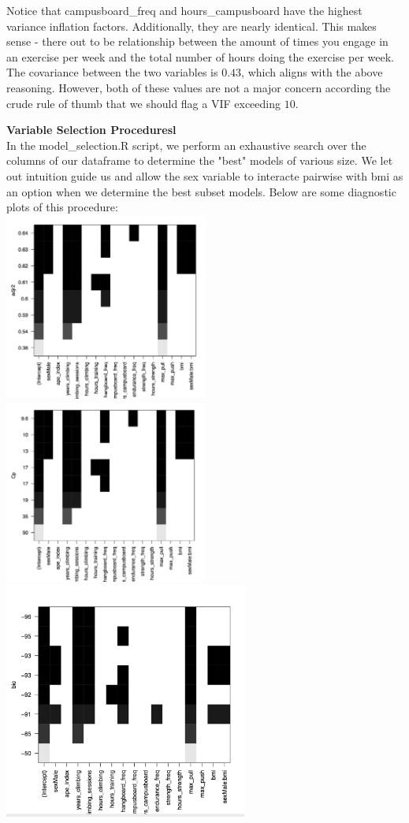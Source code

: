 \documentclass[11pt]{amsart}
\begin{document}
Notice that campusboard\_freq and hours\_campusboard have the highest variance inflation factors.
Additionally, they are nearly identical.
This makes sense - there out to be relationship between the amount of times you engage in an exercise per week and the total number of hours doing the exercise per week.
The covariance between the two variables is $0.43$, which aligns with the above reasoning. 
However, both of these values are not a major concern according the crude rule of thumb that we should flag a VIF exceeding $10$.


\newpage
{\bf\large Variable Selection Proceduresl}\\
In the model\_selection.R script, we perform an exhaustive search over the columns of our dataframe to determine the "best" models of various size.
We let out intuition guide us and allow the sex variable to interacte pairwise with bmi as an option when we determine the best subset models.
Below are some diagnostic plots of this procedure:\\


\includegraphics[width=0.5\textwidth]{rsq}
\includegraphics[width=0.5\textwidth]{cp}\\
\includegraphics[width=0.6\textwidth]{bic}\\
\end{document}
